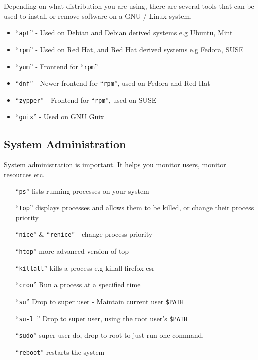 \documentclass{extbook}
\begin{document}
Depending on what distribution you are using, there are several tools that can be used to install or remove software on a GNU / Linux system.

\begin{itemize}
\item ``\verb|apt|'' - Used on Debian and Debian derived systems e.g Ubuntu, Mint
\item ``\verb|rpm|'' - Used on Red Hat, and Red Hat derived systems e.g Fedora, SUSE
\item ``\verb|yum|'' - Frontend for ``\verb|rpm|''
\item ``\verb|dnf|'' - Newer frontend for ``\verb|rpm|'', used on Fedora and Red Hat
\item ``\verb|zypper|'' - Frontend for ``\verb|rpm|'', used on SUSE
\item ``\verb|guix|'' - Used on GNU Guix
\end{itemize}

\subsection{System Administration}

System administration is important. It helps you monitor users, monitor resources etc.
\begin{itemize}
\item[``\texttt{ps}''] lists running processes on your system
\item[``\texttt{top}''] displays processes and allows them to be killed, or change their process priority
\item[``\texttt{nice}'' \& ``\texttt{renice}''] - change process priority
\item[``\texttt{htop}''] more advanced version of top
\item[``\texttt{killall}''] kills a process e.g killall firefox-esr
\item[``\texttt{cron}''] Run a process at a specified time
\item[``\texttt{su}''] Drop to super user - Maintain current user \verb|$PATH|
\item[``\texttt{su-l }''] Drop to super user, using the root user's \verb|$PATH|
\item[``\texttt{sudo}''] super user do, drop to root to just run one command.
\item[``\texttt{reboot}''] restarts the system
\end{itemize}
\end{document}
